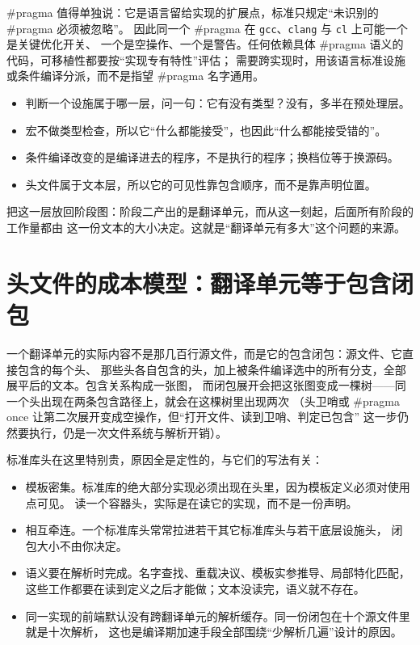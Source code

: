 \documentclass[12pt,a4paper,fontset=fandol]{ctexbook}
\newcommand{\Tool}[1]{\texttt{#1}}
\begin{document}
\#pragma 值得单独说：它是语言留给实现的扩展点，标准只规定“未识别的 \#pragma 必须被忽略”。
因此同一个 \#pragma 在 \Tool{gcc}、\Tool{clang} 与 \Tool{cl} 上可能一个是关键优化开关、
一个是空操作、一个是警告。任何依赖具体 \#pragma 语义的代码，可移植性都要按“实现专有特性”评估；
需要跨实现时，用该语言标准设施或条件编译分派，而不是指望 \#pragma 名字通用。

\begin{guideline}[title={把预处理当“文本层”而不是“语言层”}]
\begin{itemize}
  \item 判断一个设施属于哪一层，问一句：它有没有类型？没有，多半在预处理层。
  \item 宏不做类型检查，所以它“什么都能接受”，也因此“什么都能接受错的”。
  \item 条件编译改变的是编译进去的程序，不是执行的程序；换档位等于换源码。
  \item 头文件属于文本层，所以它的可见性靠包含顺序，而不是靠声明位置。
\end{itemize}
\end{guideline}

把这一层放回阶段图：阶段二产出的是翻译单元，而从这一刻起，后面所有阶段的工作量都由
这一份文本的大小决定。这就是“翻译单元有多大”这个问题的来源。

\section{头文件的成本模型：翻译单元等于包含闭包}\label{sec:cl02-cost}

一个翻译单元的实际内容不是那几百行源文件，而是它的包含闭包：源文件、它直接包含的每个头、
那些头各自包含的头，加上被条件编译选中的所有分支，全部展平后的文本。包含关系构成一张图，
而闭包展开会把这张图变成一棵树——同一个头出现在两条包含路径上，就会在这棵树里出现两次
（头卫哨或 \#pragma once 让第二次展开变成空操作，但“打开文件、读到卫哨、判定已包含”
这一步仍然要执行，仍是一次文件系统与解析开销）。

标准库头在这里特别贵，原因全是定性的，与它们的写法有关：

\begin{itemize}
  \item 模板密集。标准库的绝大部分实现必须出现在头里，因为模板定义必须对使用点可见。
    读一个容器头，实际是在读它的实现，而不是一份声明。
  \item 相互牵连。一个标准库头常常拉进若干其它标准库头与若干底层设施头，
    闭包大小不由你决定。
  \item 语义要在解析时完成。名字查找、重载决议、模板实参推导、局部特化匹配，
    这些工作都要在读到定义之后才能做；文本没读完，语义就不存在。
  \item 同一实现的前端默认没有跨翻译单元的解析缓存。同一份闭包在十个源文件里就是十次解析，
    这也是编译期加速手段全部围绕“少解析几遍”设计的原因。
\end{itemize}
\end{document}
